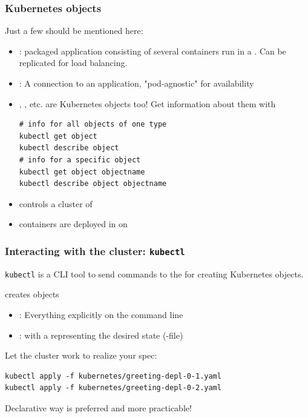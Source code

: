 \begin{frame}[fragile]
	\frametitle{Kubernetes objects}
		Just a few should be mentioned here:
		\begin{itemize}
			\item {}: packaged application consisting of several containers run in a . Can be replicated for load balancing.
			\item  {}: A connection to an application, "pod-agnostic" for availability
			\item {}, , etc. are Kubernetes objects too! Get information about them with
			\begin{lstlisting}
# info for all objects of one type
kubectl get object
kubectl describe object
# info for a specific object
kubectl get object objectname
kubectl describe object objectname
			\end{lstlisting}
		\item {} controls a cluster of 
		\item containers are deployed in  on 
			\end{itemize}

\end{frame}

\begin{frame}[fragile]
	\frametitle{Interacting with the cluster: \texttt{kubectl}}
	\begin{block}{\texttt{kubectl}}
	is a CLI tool to send commands to the  for creating Kubernetes objects.
	\end{block}
	 creates objects
	\begin{itemize}
		\item {}: Everything explicitly on the command line 
		\item {}: with a  representing the desired state (-file)
	\end{itemize}
	Let the cluster work to realize your spec:
	\begin{lstlisting}
kubectl apply -f kubernetes/greeting-depl-0-1.yaml
kubectl apply -f kubernetes/greeting-depl-0-2.yaml
	\end{lstlisting}
	Declarative way is preferred and more practicable!
\end{frame}

